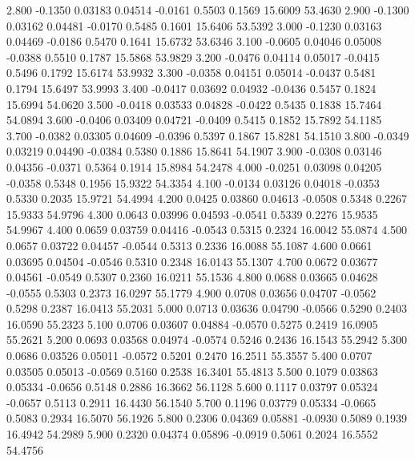    2.800  -0.1350   0.03183   0.04514  -0.0161   0.5503   0.1569  15.6009  53.4630
   2.900  -0.1300   0.03162   0.04481  -0.0170   0.5485   0.1601  15.6406  53.5392
   3.000  -0.1230   0.03163   0.04469  -0.0186   0.5470   0.1641  15.6732  53.6346
   3.100  -0.0605   0.04046   0.05008  -0.0388   0.5510   0.1787  15.5868  53.9829
   3.200  -0.0476   0.04114   0.05017  -0.0415   0.5496   0.1792  15.6174  53.9932
   3.300  -0.0358   0.04151   0.05014  -0.0437   0.5481   0.1794  15.6497  53.9993
   3.400  -0.0417   0.03692   0.04932  -0.0436   0.5457   0.1824  15.6994  54.0620
   3.500  -0.0418   0.03533   0.04828  -0.0422   0.5435   0.1838  15.7464  54.0894
   3.600  -0.0406   0.03409   0.04721  -0.0409   0.5415   0.1852  15.7892  54.1185
   3.700  -0.0382   0.03305   0.04609  -0.0396   0.5397   0.1867  15.8281  54.1510
   3.800  -0.0349   0.03219   0.04490  -0.0384   0.5380   0.1886  15.8641  54.1907
   3.900  -0.0308   0.03146   0.04356  -0.0371   0.5364   0.1914  15.8984  54.2478
   4.000  -0.0251   0.03098   0.04205  -0.0358   0.5348   0.1956  15.9322  54.3354
   4.100  -0.0134   0.03126   0.04018  -0.0353   0.5330   0.2035  15.9721  54.4994
   4.200   0.0425   0.03860   0.04613  -0.0508   0.5348   0.2267  15.9333  54.9796
   4.300   0.0643   0.03996   0.04593  -0.0541   0.5339   0.2276  15.9535  54.9967
   4.400   0.0659   0.03759   0.04416  -0.0543   0.5315   0.2324  16.0042  55.0874
   4.500   0.0657   0.03722   0.04457  -0.0544   0.5313   0.2336  16.0088  55.1087
   4.600   0.0661   0.03695   0.04504  -0.0546   0.5310   0.2348  16.0143  55.1307
   4.700   0.0672   0.03677   0.04561  -0.0549   0.5307   0.2360  16.0211  55.1536
   4.800   0.0688   0.03665   0.04628  -0.0555   0.5303   0.2373  16.0297  55.1779
   4.900   0.0708   0.03656   0.04707  -0.0562   0.5298   0.2387  16.0413  55.2031
   5.000   0.0713   0.03636   0.04790  -0.0566   0.5290   0.2403  16.0590  55.2323
   5.100   0.0706   0.03607   0.04884  -0.0570   0.5275   0.2419  16.0905  55.2621
   5.200   0.0693   0.03568   0.04974  -0.0574   0.5246   0.2436  16.1543  55.2942
   5.300   0.0686   0.03526   0.05011  -0.0572   0.5201   0.2470  16.2511  55.3557
   5.400   0.0707   0.03505   0.05013  -0.0569   0.5160   0.2538  16.3401  55.4813
   5.500   0.1079   0.03863   0.05334  -0.0656   0.5148   0.2886  16.3662  56.1128
   5.600   0.1117   0.03797   0.05324  -0.0657   0.5113   0.2911  16.4430  56.1540
   5.700   0.1196   0.03779   0.05334  -0.0665   0.5083   0.2934  16.5070  56.1926
   5.800   0.2306   0.04369   0.05881  -0.0930   0.5089   0.1939  16.4942  54.2989
   5.900   0.2320   0.04374   0.05896  -0.0919   0.5061   0.2024  16.5552  54.4756
